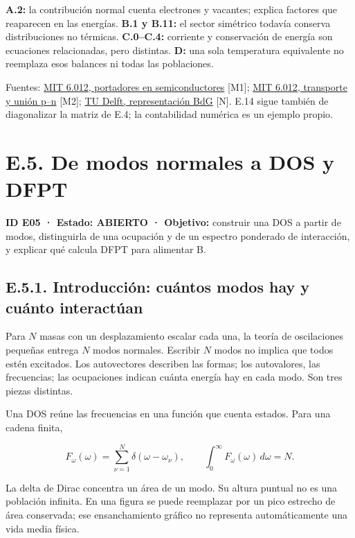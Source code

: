 \documentclass[
  spanish,
  10pt,
  a4paper,
]{article}
\begin{document}
\textbf{A.2:} la contribución normal cuenta electrones y vacantes;
explica factores que reaparecen en las energías. \textbf{B.1 y B.11:} el
sector simétrico todavía conserva distribuciones no térmicas.
\textbf{C.0--C.4:} corriente y conservación de energía son ecuaciones
relacionadas, pero distintas. \textbf{D:} una sola temperatura
equivalente no reemplaza esos balances ni todas las poblaciones.

Fuentes:
\href{https://live.ocw.mit.edu/courses/6-012-microelectronic-devices-and-circuits-fall-2009/a37c73e7fcff4bcb5c5f1177e12d0891_MIT6_012F09_lec01.pdf}{MIT
6.012, portadores en semiconductores} {[}M1{]};
\href{https://web.mit.edu/6.012/www/}{MIT 6.012, transporte y unión
p--n} {[}M2{]};
\href{https://topocondmat.org/test/w1_topointro/0d.html}{TU Delft,
representación BdG} {[}N{]}. E.14 sigue también de diagonalizar la
matriz de E.4; la contabilidad numérica es un ejemplo propio.

\newpage

\section{E.5. De modos normales a DOS y
DFPT}\label{e.5.-de-modos-normales-a-dos-y-dfpt}

\textbf{ID E05 · Estado: ABIERTO · Objetivo:} construir una DOS a partir
de modos, distinguirla de una ocupación y de un espectro ponderado de
interacción, y explicar qué calcula DFPT para alimentar B.

\subsection{E.5.1. Introducción: cuántos modos hay y cuánto
interactúan}\label{e.5.1.-introducciuxf3n-cuuxe1ntos-modos-hay-y-cuuxe1nto-interactuxfaan}

Para \(N\) masas con un desplazamiento escalar cada una, la teoría de
oscilaciones pequeñas entrega \(N\) modos normales. Escribir \(N\) modos
no implica que todos estén excitados. Los autovectores describen las
formas; los autovalores, las frecuencias; las ocupaciones indican cuánta
energía hay en cada modo. Son tres piezas distintas.

Una DOS reúne las frecuencias en una función que cuenta estados. Para
una cadena finita,

\[
F_\omega(\omega)=\sum_{\nu=1}^{N}\delta(\omega-\omega_\nu),
\qquad \int_0^\infty F_\omega(\omega)\,d\omega=N.
\tag{E.16}
\]

La delta de Dirac concentra un área de un modo. Su altura puntual no es
una población infinita. En una figura se puede reemplazar por un pico
estrecho de área conservada; ese ensanchamiento gráfico no representa
automáticamente una vida media física.
\end{document}
